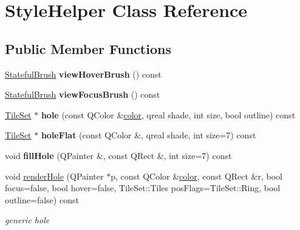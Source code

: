 \hypertarget{class_style_helper}{}\section{Style\+Helper Class Reference}
\label{class_style_helper}
\subsection*{Public Member Functions}
\begin{DoxyCompactItemize}
\item 
\mbox{\label{class_style_helper_ad63b5032c51e46b4c0cbbf188a55979a}} 
\hyperlink{class_stateful_brush}{Stateful\+Brush} {\bfseries view\+Hover\+Brush} () const
\item 
\mbox{\label{class_style_helper_a4896490d3c8a98413dbc99d2dda5f86b}} 
\hyperlink{class_stateful_brush}{Stateful\+Brush} {\bfseries view\+Focus\+Brush} () const
\item 
\mbox{\label{class_style_helper_a4c2d52437f0efa1bf6b1a5d2b99d0532}} 
\hyperlink{class_tile_set}{Tile\+Set} $\ast$ {\bfseries hole} (const Q\+Color \&\hyperlink{structcolor}{color}, qreal shade, int size, bool outline) const
\item 
\mbox{\label{class_style_helper_aca513ec7661fe737d222668c2755e146}} 
\hyperlink{class_tile_set}{Tile\+Set} $\ast$ {\bfseries hole\+Flat} (const Q\+Color \&, qreal shade, int size=7) const
\item 
\mbox{\label{class_style_helper_a833b9ca8ba241cde7d54912e86e3c929}} 
void {\bfseries fill\+Hole} (Q\+Painter \&, const Q\+Rect \&, int size=7) const
\item 
\mbox{\label{class_style_helper_adeff5d3c26579c074d21d1032a57a5f3}} 
void \hyperlink{class_style_helper_adeff5d3c26579c074d21d1032a57a5f3}{render\+Hole} (Q\+Painter $\ast$p, const Q\+Color \&\hyperlink{structcolor}{color}, const Q\+Rect \&r, bool focus=false, bool hover=false, Tile\+Set\+::\+Tiles pos\+Flags=Tile\+Set\+::\+Ring, bool outline=false) const
\begin{DoxyCompactList}\small\item\em generic hole \end{DoxyCompactList}\item 

\end{DoxyCompactItemize}
